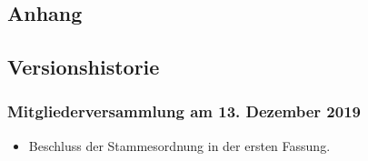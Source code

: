 \documentclass[a4paper]{article}
\begin{document}
\clearpage
\begin{appendix}
\section{Anhang}

\subsection{Versionshistorie}
\subsubsection{Mitgliederversammlung am 13. Dezember 2019}
\begin{itemize}
    \item Beschluss der Stammesordnung in der ersten Fassung.
\end{itemize}
    

\end{appendix}
\end{document}
